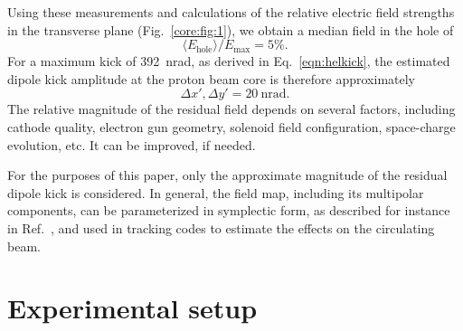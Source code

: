 \documentclass[
prstab
,reprint
,linenumbers
,longbibliography
,preprintnumbers
,showkeys
,amsfonts,amssymb,amsmath
,floatfix
]{revtex4-1}
\newcommand{\q}[2]{\ensuremath{#1\ \mathrm{#2}}} %
\begin{document}
Using these measurements and calculations of the relative electric
field strengths in the transverse plane (Fig.~\ref{core:fig:1}), we
obtain a median field in the hole of
%
\begin{equation}
  \langle E_\mathrm{hole} \rangle / E_\mathrm{max} =  5\%.
\end{equation}
%
For a maximum kick of 392~nrad, as derived in Eq.~\ref{eqn:helkick},
the estimated dipole kick amplitude at the proton beam core is therefore
approximately
%
\begin{equation}
  \label{eqn:kick_central}
  \Delta x' , \Delta y' = \q{20}{nrad}.
\end{equation}
%
The relative magnitude of the residual field depends on several
factors, including cathode quality, electron gun geometry, solenoid
field configuration, space-charge evolution, etc. It can be improved,
if needed.

For the purposes of this paper, only the approximate magnitude of the
residual dipole kick is considered. In general, the field map,
including its multipolar components, can be parameterized in
symplectic form, as described for instance in
Ref.~\cite{hel_bends_stancari}, and used in tracking codes to estimate
the effects on the circulating beam.



\section{Experimental setup}
\label{sec:exp}
\end{document}
